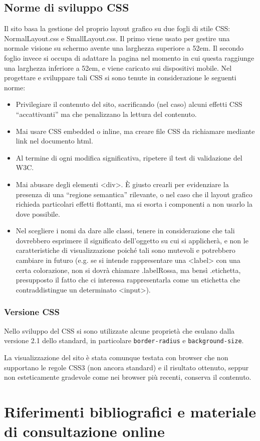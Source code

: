 \documentclass[10pt,a4paper,onecolumn]{article}
\begin{document}
\subsection{Norme di sviluppo CSS}

Il sito basa la gestione del proprio layout grafico su due fogli di stile CSS: NormalLayout.css e SmallLayout.css. Il primo viene usato per gestire una normale visione su schermo avente una larghezza superiore a 52em. Il secondo foglio invece si occupa di adattare la pagina nel momento in cui questa raggiunge una larghezza inferiore a 52em, e viene caricato sui dispositivi mobile. Nel progettare e sviluppare tali CSS si sono tenute in considerazione le seguenti norme:

\begin{itemize}
  \item Privilegiare il contenuto del sito, sacrificando (nel caso) alcuni effetti CSS ``accattivanti'' ma che penalizzano la lettura del contenuto.
  \item Mai usare CSS embedded o inline, ma creare file CSS da richiamare mediante link nel documento html.
  \item Al termine di ogni modifica significativa, ripetere il test di validazione del W3C.
  \item Mai abusare degli elementi <div>. È giusto crearli per evidenziare la presenza di una ``regione semantica'' rilevante, o nel caso che il layout grafico richieda particolari effetti flottanti, ma si esorta i componenti a non usarlo la dove possibile.
  \item Nel scegliere i nomi da dare alle classi, tenere in considerazione che tali dovrebbero esprimere il significato dell'oggetto su cui si applicherà, e non le caratteristiche di visualizzazione poiché tali sono mutevoli e potrebbero cambiare in futuro (e.g. se si intende rappresentare una <label> con una certa colorazione, non si dovrà chiamare .labelRossa, ma bensì .etichetta, presupposto il fatto che ci interessa rappresentarla come un etichetta che contraddistingue un determinato <input>).
\end{itemize}

\subsubsection{Versione CSS}
Nello sviluppo del CSS si sono utilizzate alcune proprietà che esulano dalla versione 2.1 dello standard, in particolare \verb+border-radius+ e \verb+background-size+.

La visualizzazione del sito è stata comunque testata con browser che non supportano le regole CSS3 (non ancora standard) e il risultato ottenuto, seppur non esteticamente gradevole come nei browser più recenti, conserva il contenuto.

\clearpage

\section{Riferimenti bibliografici e materiale di consultazione online}
\end{document}
